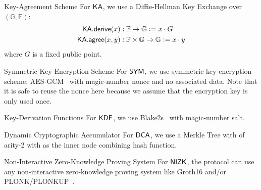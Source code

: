 \begin{definitiontoc}{Key-Agreement Scheme}
    For ${\textsf{KA}}$, we use a Diffie-Hellman Key Exchange over $(\mathbb{G}, \mathbb{F})$:
    \begin{align*}
        {\textsf{KA}}.{\textsf{derive}}(x)   &: \mathbb{F} \to \mathbb{G}                   := x \cdot G \\
        {\textsf{KA}}.{\textsf{agree}}(x, y) &: \mathbb{F} \times \mathbb{G} \to \mathbb{G} := x \cdot y
    \end{align*}
    where $G$ is a fixed public point.
\end{definitiontoc}

\begin{definitiontoc}{Symmetric-Key Encryption Scheme}
    For ${\textsf{SYM}}$, we use symmetric-key encryption scheme: AES-GCM~\cite{rfc5288} with magic-number nonce and no associated data. Note that it is safe to reuse the nonce here because we assume that the encryption key is only used once.
\end{definitiontoc}

\begin{definitiontoc}{Key-Derivation Functions}
    For ${\textsf{KDF}}$, we use Blake2s~\cite{rfc7693} with magic-number salt.
\end{definitiontoc}

\begin{definitiontoc}{Dynamic Cryptographic Accumulator}
    For ${\textsf{DCA}}$, we use a Merkle Tree with of arity-2 with \Poseidon{} as the inner node combining hash function.

\end{definitiontoc}

\begin{definitiontoc}{Non-Interactive Zero-Knowledge Proving System} \label{def:concrete-zkp}
    For ${\textsf{NIZK}}$, the protocol can use any non-interactive zero-knowledge proving system like Groth16 \cite{KRRS21USENIX} and/or PLONK/PLONKUP~\cite{plonk,plonkup}. 
\end{definitiontoc}

